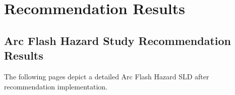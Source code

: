 \section{Recommendation Results}
\label{af:modifications}

\subsection{Arc Flash Hazard Study Recommendation Results}
\label{af:observations:at}

The following pages depict a detailed Arc Flash Hazard SLD after recommendation implementation.